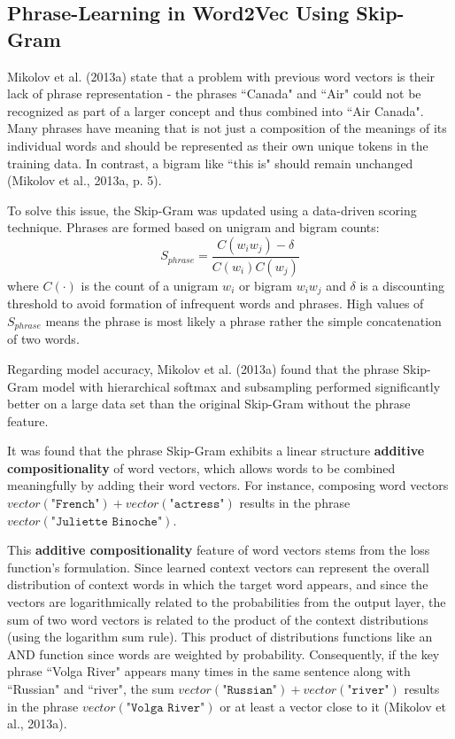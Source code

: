 \subsection{Phrase-Learning in Word2Vec Using Skip-Gram}

Mikolov et al. (2013a) state that a problem with previous word vectors is their lack of phrase representation - the phrases ``Canada" and ``Air" could not be recognized as part of a larger concept and thus combined into ``Air Canada". Many phrases have meaning that is not just a composition of the meanings of its individual words and should be represented as their own unique tokens in the training data. In contrast, a bigram like ``this is" should remain unchanged (Mikolov et al., 2013a, p. 5). 

To solve this issue, the Skip-Gram was updated using a data-driven scoring technique. Phrases are formed based on unigram and bigram counts: 
$$
S_{phrase} = \frac{C(w_i w_j) - \delta} {C(w_i)C(w_j)}
$$
where $C(\cdot)$ is the count of a unigram $w_i$ or bigram $w_i w_j$ and $\delta$ is a discounting threshold to avoid formation of infrequent words and phrases. High values of $S_{phrase}$ means the phrase is most likely a phrase rather the simple concatenation of two words. 

Regarding model accuracy, Mikolov et al. (2013a) found that the phrase Skip-Gram model with hierarchical softmax and subsampling performed significantly better on a large data set than the original Skip-Gram without the phrase feature. 

It was found that the phrase Skip-Gram exhibits a linear structure \textbf{additive compositionality} of word vectors, which allows words to be combined meaningfully by adding their word vectors. For instance, composing word vectors $vector(\texttt{"French"}) \! + \! vector(\texttt{"actress"})$ results in the phrase $vector(\texttt{"Juliette Binoche"})$. 

This \textbf{additive compositionality} feature of word vectors stems from the loss function's formulation. Since learned context vectors can represent the overall distribution of context words in which the target word appears, and since the vectors are logarithmically related to the probabilities from the output layer, the sum of two word vectors is related to the product of the context distributions (using the logarithm sum rule). This product of distributions functions like an AND function since words are weighted by probability. Consequently, if the key phrase ``Volga River" appears many times in the same sentence along with ``Russian" and ``river", the sum $vector(\texttt{"Russian"}) \! + \! vector(\texttt{"river"})$ results in the phrase $vector(\texttt{"Volga River"})$ or at least a vector close to it (Mikolov et al., 2013a). 

